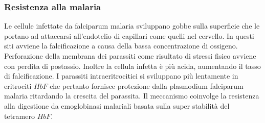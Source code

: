 \subsubsection{Resistenza alla malaria}
Le cellule infettate da falciparum malaria sviluppano gobbe sulla superficie che le portano ad attaccarsi all'endotelio di capillari come quelli nel cervello. In questi siti avviene
la falcificazione a causa della bassa concentrazione di ossigeno. Perforazione della membrana dei parassiti come risultato di stressi fisico avviene con perdita di postassio. Inoltre
la cellula infetta \`e pi\`u acida, aumentando il tasso di falcificazione. I parassiti intraeritrocitici si sviluppano pi\`u lentamente in eritrociti $HbF$ che pertanto fornisce
protezione dalla plasmodium falciparum malaria ritardando la crescita del parassita. Il meccanismo coinvolge la resistenza alla digestione da emoglobinasi malariali basata sulla 
super stabilit\`a del tetramero $HbF$. 





